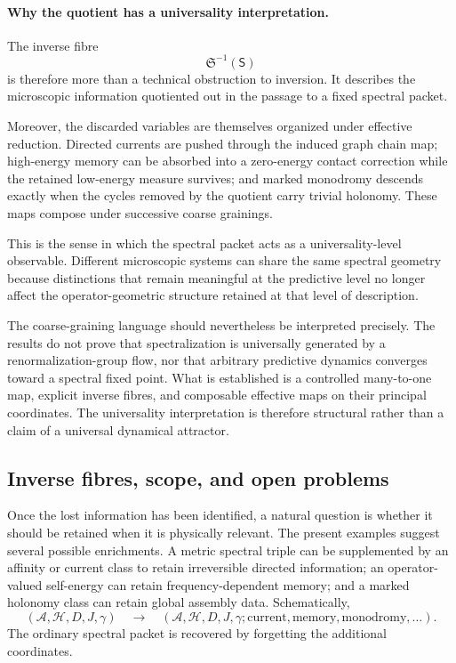 \documentclass[11pt]{article}
\theoremstyle{definition}
\theoremstyle{remark}
\theoremstyle{definition}
\theoremstyle{remark}
\newcommand{\A}{\mathcal A}
\newcommand{\Hh}{\mathcal H}
\begin{document}
\paragraph{Why the quotient has a universality interpretation.}

The inverse fibre
\begin{equation}
\mathfrak S^{-1}(\mathsf S)
\label{eq:discussion-fibre}
\end{equation}
is therefore more than a technical obstruction to inversion.  It describes the
microscopic information quotiented out in the passage to a fixed spectral packet.

Moreover, the discarded variables are themselves organized under effective
reduction.  Directed currents are pushed through the induced graph chain map;
high-energy memory can be absorbed into a zero-energy contact correction while
the retained low-energy measure survives; and marked monodromy descends exactly
when the cycles removed by the quotient carry trivial holonomy.  These maps
compose under successive coarse grainings.

This is the sense in which the spectral packet acts as a universality-level
observable.  Different microscopic systems can share the same spectral geometry
because distinctions that remain meaningful at the predictive level no longer
affect the operator-geometric structure retained at that level of description.

The coarse-graining language should nevertheless be interpreted precisely.  The
results do not prove that spectralization is universally generated by a
renormalization-group flow, nor that arbitrary predictive dynamics converges
toward a spectral fixed point.  What is established is a controlled many-to-one
map, explicit inverse fibres, and composable effective maps on their principal
coordinates.  The universality interpretation is therefore structural rather than
a claim of a universal dynamical attractor.

\subsection{Inverse fibres, scope, and open problems}

Once the lost information has been identified, a natural question is whether it
should be retained when it is physically relevant.  The present examples suggest
several possible enrichments.  A metric spectral triple can be supplemented by an
affinity or current class to retain irreversible directed information; an
operator-valued self-energy can retain frequency-dependent memory; and a marked
holonomy class can retain global assembly data.  Schematically,
\begin{equation}
(\A,\Hh,D,J,\gamma)
\quad\longrightarrow\quad
(\A,\Hh,D,J,\gamma;
\text{current},\text{memory},\text{monodromy},\ldots).
\label{eq:discussion-enrichment}
\end{equation}
The ordinary spectral packet is recovered by forgetting the additional
coordinates.
\end{document}
